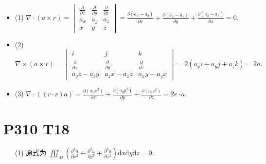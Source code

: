 \documentclass{article}
\newcommand{\dd}{\mathrm{d}}
\begin{document}
\begin{itemize}
\item (1) $\nabla \cdot (a \times r) = 
\begin{vmatrix}
\frac{\partial}{\partial x} & \frac{\partial}{\partial y} & \frac{\partial}{\partial z} \\
a_x & a_y & a_z \\
x & y & z
\end{vmatrix}
= \frac{\partial (a_x - a_y)}{\partial x} + \frac{\partial (a_x - a_z)}{\partial y} + \frac{\partial (a_y - a_x)}{\partial z} = 0.$

\item (2) $\nabla \times (a \times r) = 
\begin{vmatrix}
i & j & k \\
\frac{\partial}{\partial x} & \frac{\partial}{\partial y} & \frac{\partial}{\partial z} \\
a_y z - a_z y & a_z x - a_x z & a_x y - a_y x
\end{vmatrix}
= 2(a_x i + a_y j + a_z k) = 2a.$

\item (3) $\nabla \cdot ((r \cdot r)a) = \frac{\partial (a_x x^2)}{\partial x} + \frac{\partial (a_y y^2)}{\partial y} + \frac{\partial (a_z z^2)}{\partial z} = 2r \cdot a.$
\end{itemize}

\section*{P310 T18}

\begin{itemize}
    \item [(1)] 原式为 $\iiint_\Omega \left(\frac{\partial^2 u}{\partial x^2} + \frac{\partial^2 u}{\partial y^2} + \frac{\partial^2 u}{\partial z^2}\right)\dd x \dd y \dd z = 0$.
\end{itemize}
\end{document}

